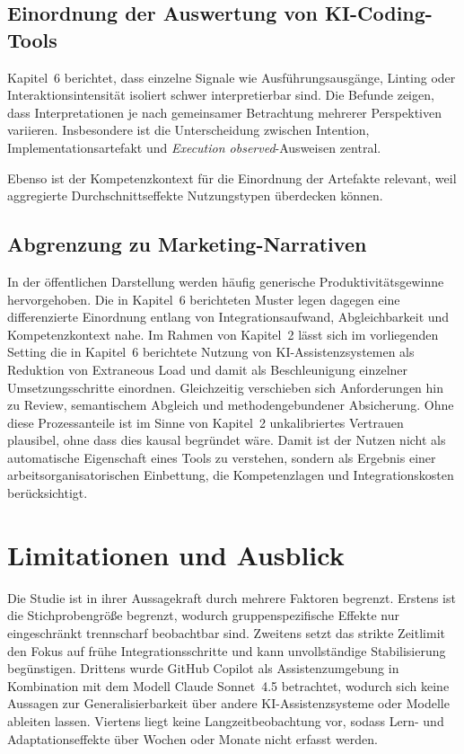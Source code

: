 \subsection{Einordnung der Auswertung von KI-Coding-Tools}
\label{sec:discussion_evaluation}

Kapitel~6 berichtet, dass einzelne Signale wie Ausf\"uhrungsausg\"ange, Linting oder Interaktionsintensit\"at isoliert schwer interpretierbar sind.
Die Befunde zeigen, dass Interpretationen je nach gemeinsamer Betrachtung mehrerer Perspektiven variieren.
Insbesondere ist die Unterscheidung zwischen Intention, Implementationsartefakt und \textit{Execution observed}-Ausweisen zentral.

Ebenso ist der Kompetenzkontext f\"ur die Einordnung der Artefakte relevant, weil aggregierte Durchschnittseffekte Nutzungstypen \"uberdecken k\"onnen.

\subsection{Abgrenzung zu Marketing-Narrativen}
\label{sec:discussion_marketing_narratives}

In der \"offentlichen Darstellung werden h\"aufig generische Produktivit\"atsgewinne hervorgehoben.
Die in Kapitel~6 berichteten Muster legen dagegen eine differenzierte Einordnung entlang von Integrationsaufwand, Abgleichbarkeit und Kompetenzkontext nahe.
Im Rahmen von Kapitel~2 l\"asst sich im vorliegenden Setting die in Kapitel~6 berichtete Nutzung von KI-Assistenzsystemen als Reduktion von Extraneous Load und damit als Beschleunigung einzelner Umsetzungsschritte einordnen.
Gleichzeitig verschieben sich Anforderungen hin zu Review, semantischem Abgleich und methodengebundener Absicherung.
Ohne diese Prozessanteile ist im Sinne von Kapitel~2 unkalibriertes Vertrauen plausibel, ohne dass dies kausal begr\"undet w\"are.
Damit ist der Nutzen nicht als automatische Eigenschaft eines Tools zu verstehen, sondern als Ergebnis einer arbeitsorganisatorischen Einbettung, die Kompetenzlagen und Integrationskosten ber\"ucksichtigt.

\section{Limitationen und Ausblick}
\label{sec:discussion_limitations}

Die Studie ist in ihrer Aussagekraft durch mehrere Faktoren begrenzt.
Erstens ist die Stichprobengr\"o\ss e begrenzt, wodurch gruppenspezifische Effekte nur eingeschr\"ankt trennscharf beobachtbar sind.
Zweitens setzt das strikte Zeitlimit den Fokus auf fr\"uhe Integrationsschritte und kann unvollst\"andige Stabilisierung beg\"unstigen.
Drittens wurde GitHub Copilot als Assistenzumgebung in Kombination mit dem Modell Claude Sonnet~4.5 betrachtet, wodurch sich keine Aussagen zur Generalisierbarkeit \"uber andere KI-Assistenzsysteme oder Modelle ableiten lassen.
Viertens liegt keine Langzeitbeobachtung vor, sodass Lern- und Adaptationseffekte \"uber Wochen oder Monate nicht erfasst werden.

